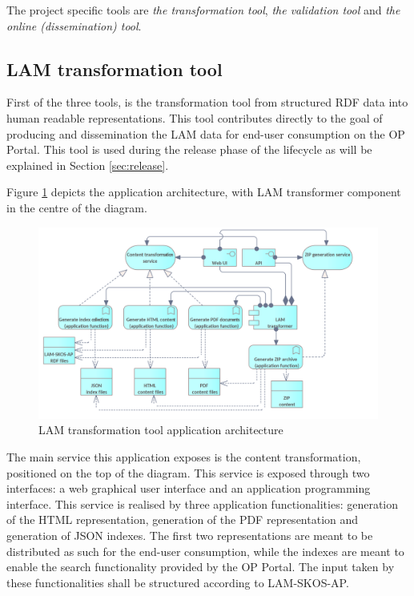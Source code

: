 	The project specific tools are \textit{the transformation tool}, \textit{the validation tool} and \textit{the online (dissemination) tool}.
	
	\subsection{LAM transformation tool}
	\label{sec:transformation-tool}
		
	First of the three tools, is the transformation tool from structured RDF data into human readable representations. This tool contributes directly to the goal of producing and dissemination the LAM data for end-user consumption on the OP Portal. This tool is used during the release phase of the lifecycle as will be explained in Section \ref{sec:release}.	
	
	Figure \ref{fig:app-transformation-tool} depicts the application architecture, with LAM transformer component in the centre of the diagram.
	
	
    \begin{figure}[!h]
		\centering
		\includegraphics[width=.98\textwidth]{images/application/Content transformer.png}
		\caption{LAM transformation tool application architecture}
		\label{fig:app-transformation-tool}
	\end{figure}



	The main service this application exposes is the content transformation, positioned on the top of the diagram. This service is exposed through two interfaces: a web graphical user interface and an application programming interface. This service is realised by three application functionalities: generation of the HTML representation, generation of the PDF representation and generation of JSON indexes. The first two representations are meant to be distributed as such for the end-user consumption, while the indexes are meant to enable the search functionality provided by the OP Portal. The input taken by these functionalities shall be structured according to LAM-SKOS-AP\cite{lam-skos-ap-2019}.
	
